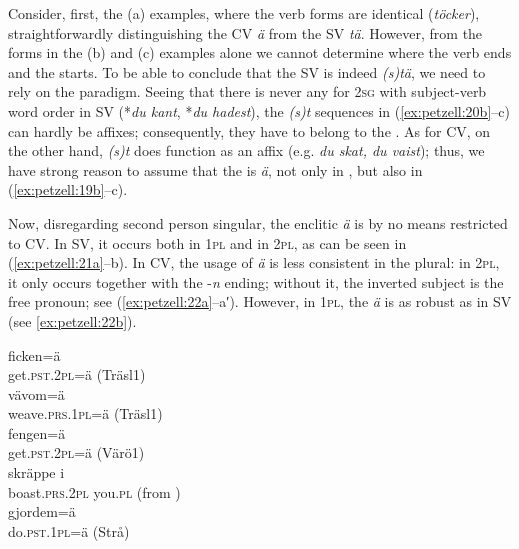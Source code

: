 \documentclass[output=paper,colorlinks,citecolor=brown,draft,draftmode]{langscibook}
\begin{document}
Consider, first, the (a) examples, where the verb forms are identical (\textit{töcker}), straightforwardly distinguishing the CV  \textit{ä} from the SV  \textit{tä}. However, from the forms in the (b) and (c) examples alone we cannot determine where the verb ends and the  starts. To be able to conclude that the SV  is indeed \textit{(s)tä}, we need to rely on the  paradigm. Seeing that there is never any  for 2\textsc{sg} with subject-verb word order in SV (*\textit{du kant}, *\textit{du hadest}), the \textit{(s)t} sequences in (\ref{ex:petzell:20b}–c) can hardly be affixes; consequently, they have to belong to the . As for CV, on the other hand, \textit{(s)t} does function as an affix (e.g. \textit{du skat, du vaist}); thus, we have strong reason to assume that the  is \textit{ä}, not only in , but also in (\ref{ex:petzell:19b}–c).



Now, disregarding second person singular, the enclitic \textit{ä} is by no means restricted to CV. In SV, it occurs both in 1\textsc{pl} and in 2\textsc{pl,} as can be seen in (\ref{ex:petzell:21a}–b). In CV, the usage of \textit{ä} is less consistent in the plural: in 2\textsc{pl}, it only occurs together with the -\textit{n} ending; without it, the inverted subject is the free pronoun; see (\ref{ex:petzell:22a}–a′). However, in 1\textsc{pl}, the \textit{ä} is as robust as in SV (see \ref{ex:petzell:22b}).


\ea\label{ex:petzell:21}
\ea\label{ex:petzell:21a}
\gll ficken=ä \\
    get.\textsc{pst}.2\textsc{pl}=ä (Träsl1)  \\
\ex\label{ex:petzell:21b}
\gll vävom=ä   \\
    weave.\textsc{prs}.1\textsc{pl}=ä (Träsl1)\\
\z
\ex\label{ex:petzell:22}
\ea\label{ex:petzell:22a}
\gll fengen=ä \\
    get.\textsc{pst}.2\textsc{pl}=ä (Värö1)  \\
\gll skräppe      i\\
    boast.\textsc{prs}.2\textsc{pl}   you.\textsc{pl} (from \citealt{Lindberg1927})  \\
\ex\label{ex:petzell:22b}
\gll gjordem=ä   \\
    do.\textsc{pst}.1\textsc{pl}=ä (Strå)\\
\z
\z
\end{document}
